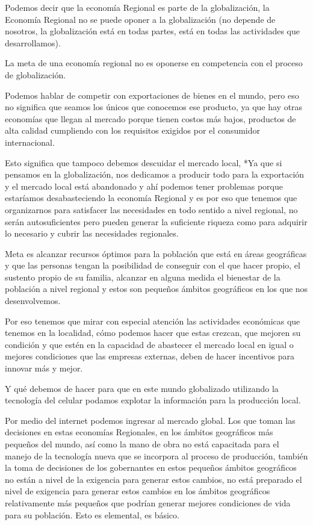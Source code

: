 \documentclass[
  a4paper,
]{article}
\begin{document}
Podemos decir que la economía Regional es parte de la globalización, la
Economía Regional no se puede oponer a la globalización (no depende de
nosotros, la globalización está en todas partes, está en todas las
actividades que desarrollamos).

La meta de una economía regional no es oponerse en competencia con el
proceso de globalización.

Podemos hablar de competir con exportaciones de bienes en el mundo, pero
eso no significa que seamos los únicos que conocemos ese producto, ya
que hay otras economías que llegan al mercado porque tienen costos más
bajos, productos de alta calidad cumpliendo con los requisitos exigidos
por el consumidor internacional.

Esto significa que tampoco debemos descuidar el mercado local, *Ya que
si pensamos en la globalización, nos dedicamos a producir todo para la
exportación y el mercado local está abandonado y ahí podemos tener
problemas porque estaríamos desabasteciendo la economía Regional y es
por eso que tenemos que organizarnos para satisfacer las necesidades en
todo sentido a nivel regional, no serán autosuficientes pero pueden
generar la suficiente riqueza como para adquirir lo necesario y cubrir
las necesidades regionales.

Meta es alcanzar recursos óptimos para la población que está en áreas
geográficas y que las personas tengan la posibilidad de conseguir con el
que hacer propio, el sustento propio de su familia, alcanzar en alguna
medida el bienestar de la población a nivel regional y estos son
pequeños ámbitos geográficos en los que nos desenvolvemos.

Por eso tenemos que mirar con especial atención las actividades
económicas que tenemos en la localidad, cómo podemos hacer que estas
crezcan, que mejoren su condición y que estén en la capacidad de
abastecer el mercado local en igual o mejores condiciones que las
empresas externas, deben de hacer incentivos para innovar más y mejor.

Y qué debemos de hacer para que en este mundo globalizado utilizando la
tecnología del celular podamos explotar la información para la
producción local.

Por medio del internet podemos ingresar al mercado global. Los que toman
las decisiones en estas economías Regionales, en los ámbitos geográficos
más pequeños del mundo, así como la mano de obra no está capacitada para
el manejo de la tecnología nueva que se incorpora al proceso de
producción, también la toma de decisiones de los gobernantes en estos
pequeños ámbitos geográficos no están a nivel de la exigencia para
generar estos cambios, no está preparado el nivel de exigencia para
generar estos cambios en los ámbitos geográficos relativamente más
pequeños que podrían generar mejores condiciones de vida para su
población. Esto es elemental, es básico.
\end{document}
